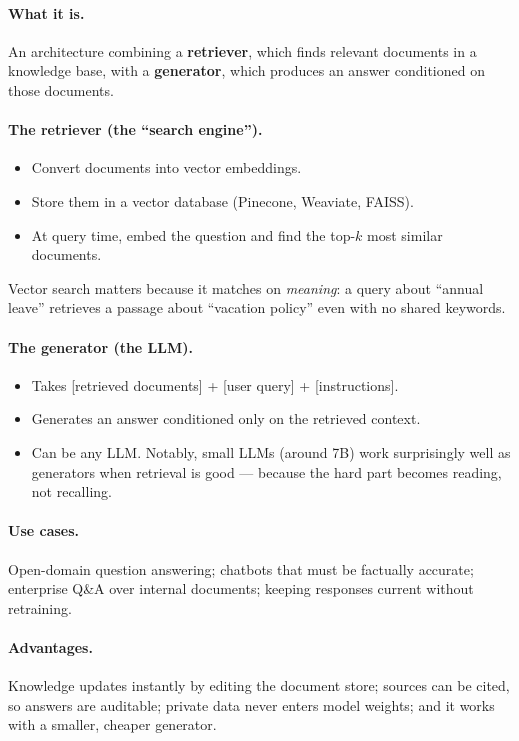 \documentclass[11pt,a4paper]{article}
\begin{document}
\paragraph{What it is.} An architecture combining a \textbf{retriever}, which finds relevant
documents in a knowledge base, with a \textbf{generator}, which produces an answer conditioned
on those documents.

\paragraph{The retriever (the ``search engine'').}
\begin{itemize}
\item Convert documents into vector embeddings.
\item Store them in a vector database (Pinecone, Weaviate, FAISS).
\item At query time, embed the question and find the top-$k$ most similar documents.
\end{itemize}
Vector search matters because it matches on \emph{meaning}: a query about ``annual leave''
retrieves a passage about ``vacation policy'' even with no shared keywords.

\paragraph{The generator (the LLM).}
\begin{itemize}
\item Takes [retrieved documents] + [user query] + [instructions].
\item Generates an answer conditioned only on the retrieved context.
\item Can be any LLM. Notably, small LLMs (around 7B) work surprisingly well as generators
  when retrieval is good --- because the hard part becomes reading, not recalling.
\end{itemize}

\paragraph{Use cases.} Open-domain question answering; chatbots that must be factually
accurate; enterprise Q\&A over internal documents; keeping responses current without
retraining.

\paragraph{Advantages.} Knowledge updates instantly by editing the document store; sources can
be cited, so answers are auditable; private data never enters model weights; and it works with
a smaller, cheaper generator.
\end{document}
